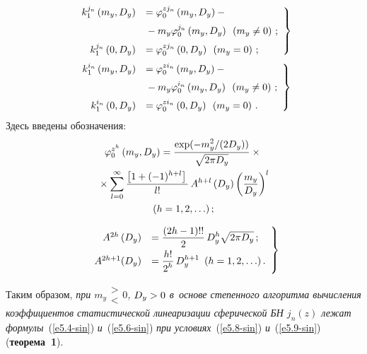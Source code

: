 \begin{multicols}{2}
\begin{equation}
\left.
\begin{array}{rl}
k_1^{j_n} \left(m_y, D_y\right)& = 
\varphi_0^{zj_n} \left(m_y, D_y\right) -{}\\[6pt]
&{}- m_y \varphi_0^{j_n} \left(m_y, D_y\right) \enskip 
\left(m_y \ne 0\right)\,;\\[6pt]
k_1^{j_n} \left(0, D_y\right) &= \varphi_0^{zj_n} \left(0, D_y\right) 
 \enskip \left(m_y =0\right)\,;
 \end{array}
 \right\}
 \label{e5.6-sin}
 \end{equation}
 \begin{equation}
\left.
\begin{array}{rl}
k_1^{i_n} \left(m_y, D_y\right) &= 
\varphi_0^{zi_n} \left(m_y, D_y\right) -{}\\[6pt]
&{}- m_y \varphi_0^{i_n} 
\left(m_y, D_y\right) \enskip
\left(m_y \ne 0\right)\,;\\[6pt]
k_1^{i_n} \left(0, D_y\right) &= \varphi_0^{zi_n} \left(0, D_y\right)\enskip 
\left(m_y =0\right)\,.
\end{array}
\right\}
\label{e5.7-sin}
\end{equation}
Здесь введены обозначения:
    \begin{multline}
    \varphi_0^{z^h} \left(m_y, D_y\right) = 
    \displaystyle\frac{\displaystyle \exp (-m_y^2 /(2D_y))\mathstrut}{\displaystyle \sqrt{2\pi D_y}\mathstrut} \times{}\\
    {}\times
    \sum\limits_{l=0}^\infty \displaystyle\frac{\displaystyle \left[ 1+ (-1)^{h+l}\right] \mathstrut}{\displaystyle l!\mathstrut}\, A^{h+l} \left(D_y\right) 
    \left( \displaystyle\frac{\displaystyle m_y\mathstrut}{\displaystyle D_y\mathstrut}\right)^l\\ (h=1,2,\ldots)\,;\label{e5.8-sin}
    \end{multline}
    
    \vspace*{-12pt}
    
    \noindent
    \begin{equation}
    \left.
    \begin{array}{rl}
    A^{2h} \left(D_y\right) &= \displaystyle\displaystyle\frac{\displaystyle (2h-1)!!\mathstrut}{\displaystyle 2\mathstrut}\, 
    D_y^h \sqrt{2\pi D_y}\,; \\[6pt] 
    A^{2h+1} (D_y) &= 
    \displaystyle
    \displaystyle\frac{\displaystyle h!\mathstrut}{\displaystyle 2^h \mathstrut}\, D_y^{h+1}\enskip (h=1,2,\ldots)\,.
    \end{array}
    \right\}
    \label{e5.9-sin}
    \end{equation}

Таким образом, \textit{при $m_y \begin{matrix}
>\\  < \end{matrix} 0$, $D_y\hm>0$ в~основе степенного алгоритма 
вычисления коэффициентов статистической линеаризации сферической 
БН $j_n(z)$ лежат формулы}~(\ref{e5.4-sin}) \textit{и}~(\ref{e5.6-sin}) 
\textit{при условиях}~(\ref{e5.8-sin})  \textit{и}~(\ref{e5.9-sin}) (\textbf{теорема~1}).


\end{multicols}
